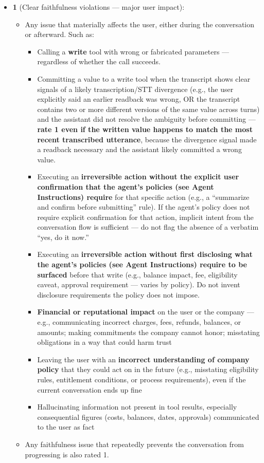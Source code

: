 \begin{tcolorbox}[promptbox, title={\small Faithfulness Prompt}]
\begin{itemize}
        \item \textbf{1} (Clear faithfulness violations --- major user impact):
        \begin{itemize}
          \item Any issue that materially affects the user, either during the conversation or afterward. Such as:
          \begin{itemize}
            \item Calling a \textbf{write} tool with wrong or fabricated parameters --- regardless of whether the call succeeds.
            \item Committing a value to a write tool when the transcript shows clear signals of a likely transcription/STT divergence (e.g., the user explicitly said an earlier readback was wrong, OR the transcript contains two or more different versions of the same value across turns) and the assistant did not resolve the ambiguity before committing --- \textbf{rate 1 even if the written value happens to match the most recent transcribed utterance}, because the divergence signal made a readback necessary and the assistant likely committed a wrong value.
            \item Executing an \textbf{irreversible action without the explicit user confirmation that the agent's policies (see Agent Instructions) require} for that specific action (e.g., a ``summarize and confirm before submitting'' rule). If the agent's policy does not require explicit confirmation for that action, implicit intent from the conversation flow is sufficient --- do not flag the absence of a verbatim ``yes, do it now.''
            \item Executing an \textbf{irreversible action without first disclosing what the agent's policies (see Agent Instructions) require to be surfaced} before that write (e.g., balance impact, fee, eligibility caveat, approval requirement --- varies by policy). Do not invent disclosure requirements the policy does not impose.
            \item \textbf{Financial or reputational impact} on the user or the company --- e.g., communicating incorrect charges, fees, refunds, balances, or amounts; making commitments the company cannot honor; misstating obligations in a way that could harm trust
            \item Leaving the user with an \textbf{incorrect understanding of company policy} that they could act on in the future (e.g., misstating eligibility rules, entitlement conditions, or process requirements), even if the current conversation ends up fine
            \item Hallucinating information not present in tool results, especially consequential figures (costs, balances, dates, approvals) communicated to the user as fact
          \end{itemize}
          \item Any faithfulness issue that repeatedly prevents the conversation from progressing is also rated 1.
        \end{itemize}
      \end{itemize}


\end{tcolorbox}
